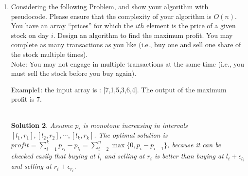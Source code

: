 \documentclass{article}
\newtheorem*{solution}{Solution}
\begin{document}
\begin{enumerate}
~\\
\begin{solution} Sort by $\dfrac{l_i}{w_i}$.\\
    \begin{minipage}[t]{0.8\textwidth}
        \begin{algorithm}[H]
    
            \BlankLine
            \caption{Greedy-smallest-l/w-first}\label{Alg-greedy2}
            Sort $n$ jobs so that $\dfrac{l_1}{w_1}\leq \dfrac{l_2}{w_2}\leq \cdots \leq \dfrac{l_n}{w_n}$\\
            $t \leftarrow 0$\\
        \end{algorithm}
        \end{minipage}\\
\end{solution}
~\\

\item Considering the following Problem, and show your algorithm with pseudocode. Please ensure that the complexity of your algorithm is $O(n)$.\\
You have an array “prices” for which the $ith$ element is the price of a given stock on day $i$. Design an algorithm to find the maximum profit. You may complete as many transactions as you like (i.e., buy one and sell one share of the stock multiple times).\\

Note: You may not engage in multiple transactions at the same time (i.e., you must sell the stock before you buy again).

Example1: the input array is : [7,1,5,3,6,4]. The output of the maximum profit is 7.\\


~\\
\begin{solution} Assume $p_i$ is monotone increasing in intervals $[l_1,r_1],[l_2,r_2],\cdots,[l_k,r_k]$. The optimal solution is $profit = \sum_{i=1}^k p_{r_i}-p_{l_i}=\sum_{i=2}^n \max\{0, p_i-p_{i-1}\}$, because it can be checked easily that buying at $l_i$ and selling at $r_i$ is better than buying at $l_i+\epsilon_{l_i}$ and selling at $r_i+\epsilon_{r_i}$.\\
    \begin{minipage}[t]{0.8\textwidth}
        \begin{algorithm}[H]
    

\end{algorithm}
\end{minipage}
\end{solution}
\end{enumerate}
\end{document}
